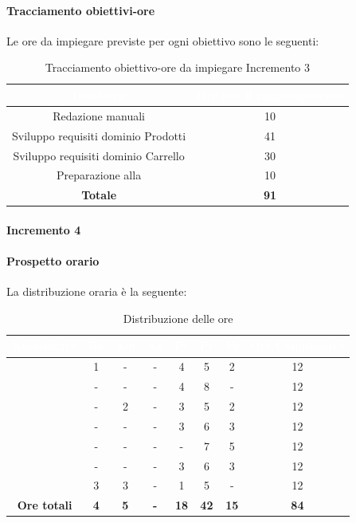 \paragraph*{Tracciamento obiettivi-ore}
Le ore da impiegare previste per ogni obiettivo sono le seguenti:
\begin{table}[H]
	\begin{center}
		\begin{tabular}{ |c c| }
			\rowcolor{darkblue} 
			\textcolor{white}{\textbf{Obiettivo}}	& \textcolor{white}{\textbf{Ore per il raggiungimento}} \\ \hline
			{Redazione manuali} 					& 10 	\\ \hline
			{Sviluppo requisiti dominio Prodotti} 	& 41 	\\ \hline
			{Sviluppo requisiti dominio Carrello} 	& 30 	\\ \hline
			{Preparazione alla \glo{PB}} 			&  10	\\ \hline
			\textbf{Totale} 						& \textbf{91}  \\ \hline
		\end{tabular}
		\caption{Tracciamento obiettivo-ore da impiegare Incremento 3}
	\end{center}
\end{table}
\paragraph{Incremento 4}
\paragraph*{Prospetto orario}
La distribuzione oraria è la seguente:
\begin{table}[H]
	\begin{center}
		\begin{tabular}{ |c c c c c c c c| }
			\rowcolor{darkblue} 
			\textcolor{white}{\textbf{Nominativo}} & \textcolor{white}{\textbf{Re}} & \textcolor{white}{\textbf{Am}} & \textcolor{white}{\textbf{An}} & \textcolor{white}{\textbf{Pt}} & \textcolor{white}{\textbf{Pr}} & \textcolor{white}{\textbf{Ve}} & \textcolor{white}{\textbf{Ore Complessive}} \\ \hline
			\BL 	& 1  	& -  	& - 	& 4 	& 5 	& 2 	& 12 \\ \hline
			\FF 	& -  	& -  	& - 	& 4 	& 8 	& -  	& 12 \\ \hline
			\MM 	& -  	& 2  	& - 	& 3 	& 5 	& 2 	& 12 \\ \hline
			\PC 	& - 	& -  	& - 	& 3 	& 6 	& 3 	& 12 \\ \hline
			\TG 	& -  	& -		& - 	& - 	& 7 	& 5 	& 12 \\ \hline
			\TL 	& -  	& - 	& - 	& 3 	& 6 	& 3 	& 12 \\ \hline
			\VD 	& 3  	& 3  	& - 	& 1 	& 5 	& -		& 12 \\ \hline
			\textbf{Ore totali} & \textbf{4} & \textbf{5} & \textbf{-} & \textbf{18} & \textbf{42} & \textbf{15} & \textbf{84} \\ \hline
		\end{tabular}
		\caption{Distribuzione delle ore}
	\end{center}
\end{table}

